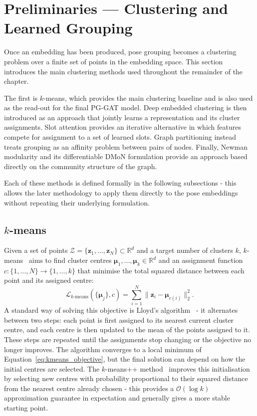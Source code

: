 \section{Preliminaries --- Clustering and Learned Grouping}
\label{sec_meth_clustering}

Once an embedding has been produced,
pose grouping becomes a clustering problem over a finite set of points in the embedding space.
This section introduces the main clustering methods used throughout the remainder of the chapter.

The first is $k$-means,
which provides the main clustering baseline and is also used as the read-out for the final PG-GAT model.
Deep embedded clustering is then introduced
as an approach that jointly learns a representation and its cluster assignments.
Slot attention provides an iterative alternative
in which features compete for assignment to a set of learned slots.
Graph partitioning instead treats grouping as an affinity problem between pairs of nodes.
Finally, Newman modularity and its differentiable DMoN formulation
provide an approach based directly on the community structure of the graph.

Each of these methods is defined formally in the following subsections -
this allows the later methodology to apply them directly to the pose embeddings
without repeating their underlying formulation.

\subsection{$k$-means}
\label{sec_meth_kmeans}

Given a set of points $\mathcal{Z} = \{\mathbf{z}_1, \dots, \mathbf{z}_N\} \subset \mathbb{R}^{d}$
and a target number of clusters $k$,
$k$-means~\cite{macqueen1967kmeans} aims to find cluster centres
$\boldsymbol{\mu}_1, \dots, \boldsymbol{\mu}_k \in \mathbb{R}^{d}$
and an assignment function $c : \{1, \dots, N\} \to \{1, \dots, k\}$
that minimise the total squared distance between each point and its assigned centre:
\begin{equation}
    \mathcal{L}_{k\text{-means}}(\{\boldsymbol{\mu}_j\}, c)
    = \sum_{i=1}^{N}
    \|\mathbf{z}_i - \boldsymbol{\mu}_{c(i)}\|_2^{2}.
    \label{eq:kmeans_objective}
\end{equation}
A standard way of solving this objective is Lloyd's algorithm~\cite{lloyd1982kmeans} -
it alternates between two steps:
each point is first assigned to its nearest current cluster centre,
and each centre is then updated to the mean of the points assigned to it.
These steps are repeated until the assignments stop changing or the objective no longer improves.
The algorithm converges to a local minimum of Equation~\eqref{eq:kmeans_objective},
but the final solution can depend on how the initial centres are selected.
The $k$-means++ method~\cite{arthur2007kmeanspp} improves this initialisation
by selecting new centres with probability proportional to their squared distance
from the nearest centre already chosen -
this provides a $\mathcal{O}(\log k)$ approximation guarantee in expectation
and generally gives a more stable starting point.


